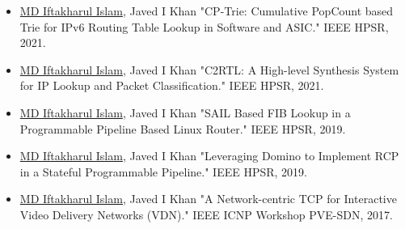 \documentclass[10pt,a4paper,ragged2e]{altacv}
\begin{document}
\begin{itemize}
	\item \underline{MD Iftakharul Islam}, Javed I Khan "CP-Trie: Cumulative PopCount based Trie for IPv6 Routing Table Lookup in Software and ASIC." IEEE HPSR, 2021.
	\item \underline{MD Iftakharul Islam}, Javed I Khan "C2RTL: A High-level Synthesis System for IP Lookup and Packet Classification." IEEE HPSR, 2021.
	\item \underline{MD Iftakharul Islam}, Javed I Khan "SAIL Based FIB Lookup in a Programmable Pipeline Based Linux Router." IEEE HPSR, 2019.
	\item \underline{MD Iftakharul Islam}, Javed I Khan "Leveraging Domino to Implement RCP in a Stateful Programmable Pipeline." IEEE HPSR, 2019.
	\item \underline{MD Iftakharul Islam}, Javed I Khan "A Network-centric TCP for Interactive Video Delivery Networks (VDN)." IEEE ICNP Workshop PVE-SDN, 2017.
	
\end{itemize}






\end{document}
